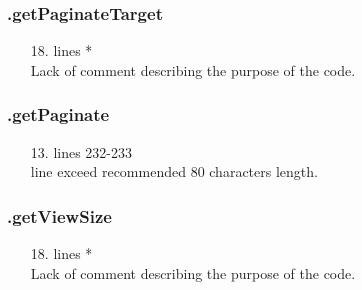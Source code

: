 \documentclass[english]{article}
\begin{document}
\subsubsection*{.getPaginateTarget}
\begin{itemize}
\item[18.]{lines  *\\
		Lack of comment describing the purpose of the code.}
\end{itemize}

\subsubsection*{.getPaginate}
\begin{itemize}
\item[13.]{lines 232-233 \\
		line exceed recommended 80 characters length.}
\end{itemize}
\subsubsection*{.getViewSize}
\begin{itemize}
\item[18.]{lines  *\\
		Lack of comment describing the purpose of the code.}
\end{itemize}
\end{document}
